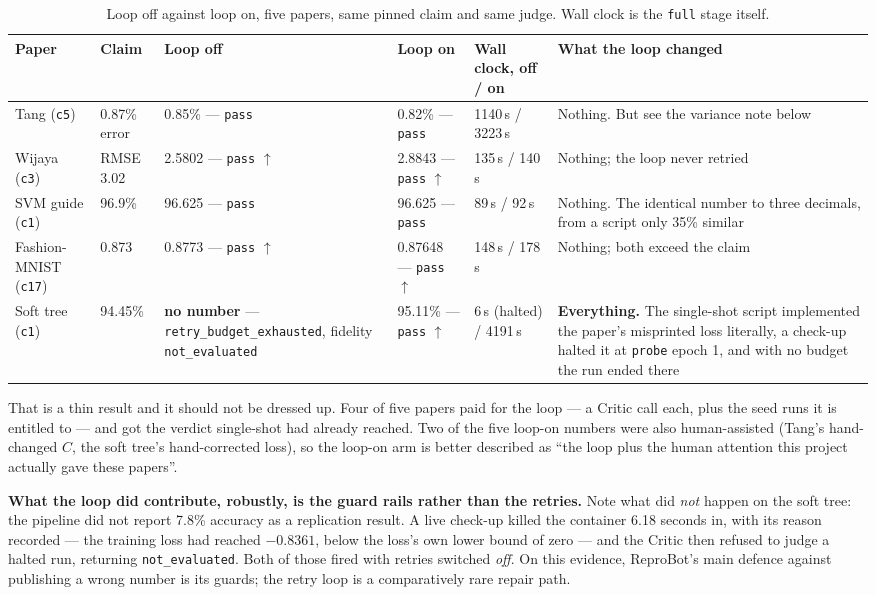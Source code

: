\documentclass[10pt,twocolumn]{article}
\newcommand{\squeeze}{\setlength{\tabcolsep}{4pt}}
\begin{document}
\begin{table}[tbp]
\centering
\small
\caption{Loop off against loop on, five papers, same pinned claim and same judge. Wall clock is
the \texttt{full} stage itself.}
\label{tab:ablation}
\squeeze
\begin{tabular}{L{0.12\textwidth}L{0.09\textwidth}L{0.155\textwidth}L{0.145\textwidth}L{0.09\textwidth}L{0.24\textwidth}}
\toprule
Paper & Claim & Loop off & Loop on & Wall clock, off / on & What the loop changed \\
\midrule
Tang (\texttt{c5}) & 0.87\% error & 0.85\% --- \texttt{pass} & 0.82\% --- \texttt{pass} & 1140\,s /
  3223\,s & Nothing. But see the variance note below \\
Wijaya (\texttt{c3}) & RMSE 3.02 & 2.5802 --- \texttt{pass} $\uparrow$ & 2.8843 ---
  \texttt{pass} $\uparrow$ & 135\,s / 140\,s & Nothing; the loop never retried \\
SVM guide (\texttt{c1}) & 96.9\% & 96.625 --- \texttt{pass} & 96.625 --- \texttt{pass} & 89\,s /
  92\,s & Nothing. The identical number to three decimals, from a script only 35\% similar \\
Fashion-MNIST (\texttt{c17}) & 0.873 & 0.8773 --- \texttt{pass} $\uparrow$ & 0.87648 ---
  \texttt{pass} $\uparrow$ & 148\,s / 178\,s & Nothing; both exceed the claim \\
Soft tree (\texttt{c1}) & 94.45\% & \textbf{no number} --- \texttt{retry\_}\allowbreak\texttt{budget\_}\allowbreak\texttt{exhausted},
  fidelity \texttt{not\_}\allowbreak\texttt{evaluated} & 95.11\% --- \texttt{pass} $\uparrow$ & 6\,s (halted) /
  4191\,s & \textbf{Everything.} The single-shot script implemented the paper's misprinted loss
  literally, a check-up halted it at \texttt{probe} epoch 1, and with no budget the run ended
  there \\
\bottomrule
\end{tabular}
\end{table}

That is a thin result and it should not be dressed up. Four of five papers paid for the loop ---
a Critic call each, plus the seed runs it is entitled to --- and got the verdict single-shot had
already reached. Two of the five loop-on numbers were also human-assisted (Tang's hand-changed
$C$, the soft tree's hand-corrected loss), so the loop-on arm is better described as ``the loop
plus the human attention this project actually gave these papers''.

\textbf{What the loop did contribute, robustly, is the guard rails rather than the retries.} Note
what did \emph{not} happen on the soft tree: the pipeline did not report 7.8\% accuracy as a
replication result. A live check-up killed the container 6.18 seconds in, with its reason
recorded --- the training loss had reached $-0.8361$, below the loss's own lower bound of zero ---
and the Critic then refused to judge a halted run, returning \texttt{not\_evaluated}. Both of
those fired with retries switched \emph{off}. On this evidence, ReproBot's main defence against
publishing a wrong number is its guards; the retry loop is a comparatively rare repair path.
\end{document}
